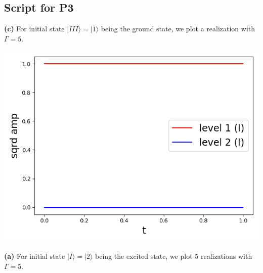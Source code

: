 \documentclass[11pt, oneside]{book}
\theoremstyle{break}
\theoremstyle{break}
\begin{document}
\subsection*{Script for P3}
\lstset{style=mystyle}

\newpage

\textbf{(c)} For initial state $|III\rangle = |1\rangle$ being the ground state, we plot a realization with $\Gamma = 5$. 
\begin{center}
\includegraphics[scale=0.39]{542HW2/III_single.png}
\end{center}
\hfill\break
\hfill\break
\textbf{(a)} For initial state $|I\rangle = |2\rangle$ being the excited state, we plot $5$ realizations with $\Gamma = 5$. 
\end{document}
